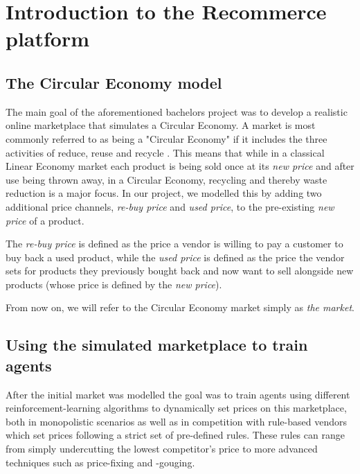 \section{Introduction to the Recommerce platform}

\subsection{The Circular Economy model}\label{subsection:CircularEconomy}
The main goal of the aforementioned bachelors project was to develop a realistic online marketplace that simulates
a Circular Economy. A market is most commonly referred to as being a "Circular Economy" if it includes the three
activities of reduce, reuse and recycle \cite{circularEconomyDefinition}. This means that while in a classical
Linear Economy market each product is being sold once at its \emph{new price} and after use being thrown away,
in a Circular Economy, recycling and thereby waste reduction is a major focus. In our project, we modelled this by
adding two additional price channels, \emph{re-buy price} and \emph{used price}, to the pre-existing \emph{new price} of a product.

The \emph{re-buy price} is defined as the price a vendor is willing to pay a customer to buy back a used product, while the
\emph{used price} is defined as the price the vendor sets for products they previously bought back and now want to sell alongside new products
(whose price is defined by the \emph{new price}).

From now on, we will refer to the Circular Economy market simply as \emph{the market}.

\subsection{Using the simulated marketplace to train agents}\label{subsection:ReinforcementLearningIntroduction}

After the initial market was modelled the goal was to train agents using different reinforcement-learning algorithms
to dynamically set prices on this marketplace, both in monopolistic scenarios as well as in competition with rule-based vendors
which set prices following a strict set of pre-defined rules. These rules can range from simply undercutting the
lowest competitor's price to more advanced techniques such as price-fixing and -gouging.

